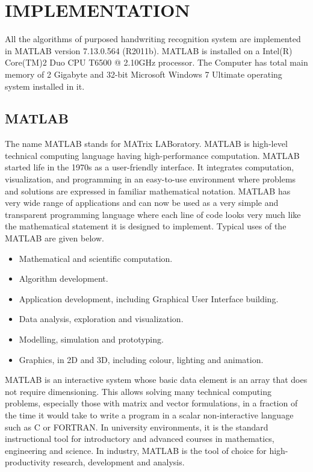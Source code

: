 \newpage
\chapter{IMPLEMENTATION}\label{chapter_implementation}

All the algorithms of purposed handwriting recognition system are implemented in MATLAB \textregistered version 7.13.0.564 (R2011b). MATLAB is installed on a Intel(R) Core(TM)2 Duo CPU T6500 @ 2.10GHz processor. The Computer has total main memory of 2 Gigabyte and 32-bit Microsoft Windows 7 Ultimate operating system installed in it.

\section{MATLAB}
The name MATLAB stands for MATrix LABoratory. MATLAB is high-level technical computing language having high-performance computation. MATLAB started life in the 1970s as a user-friendly interface. It integrates computation, visualization, and programming in an easy-to-use environment where problems and solutions are expressed in familiar mathematical notation. MATLAB has very wide range of applications and can now be used as a very simple and transparent programming language where each line of code looks very much like the mathematical statement it is designed to implement. Typical uses of the MATLAB are given below.

\begin{itemize}
\itemsep0em 
\item Mathematical and scientific computation.
\item Algorithm development.
\item Application development, including Graphical User Interface building.
\item Data analysis, exploration and visualization.
\item Modelling, simulation and prototyping.
\item Graphics, in 2D and 3D, including colour, lighting and animation.
\end{itemize}


MATLAB is an interactive system whose basic data element is an array that does not require dimensioning. This allows solving many technical computing problems, especially those with matrix and vector formulations, in a fraction of the time it would take to write a program in a scalar non-interactive language such as C or FORTRAN. In university environments, it is the standard instructional tool for introductory and advanced courses in mathematics, engineering and science. In industry, MATLAB is the tool of choice for high-productivity research, development and analysis.

